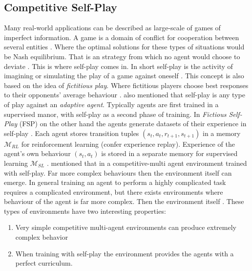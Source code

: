 \documentclass{kththesis}
\theoremstyle{definition}
\begin{document}
\subsection{Competitive Self-Play}
Many real-world applications can be described as large-scale of games of imperfect information. A game is a domain of conflict for cooperation between several entities \parencite{heinrich2016deep}. Where the optimal solutions for these types of situations would be Nash equilibrium. That is an strategy from which no agent would choose to deviate \parencite{heinrich2016deep}. This is where self-play comes in. In short self-play is the activity of imagining or simulating the play of a game against oneself \parencite{heinrich2017reinforcement}. This concept is also based on the idea of \textit{fictitious play}.  Where fictitious players choose best responses to their opponents' average behaviour \parencite{heinrich2016deep}. 
\newline
\newline
\textcite{tampuu2017multiagent} also mentioned that self-play is any type of play against an \textit{adaptive agent}. Typically agents are first trained in a supervised manor, with self-play as a second phase of training. In \textit{Fictious Self-Play} (FSP) on the other hand the agents generate datasets of their experience in self-play \parencite{heinrich2016deep}.  Each agent stores transition tuples $(s_t, a_t, r_{t+1}, s_{t+1})$ in a memory $\mathcal{M}_{RL}$ for reinforcement learning (confer experience replay). Experience of the agent's own behaviour $(s_t, a_t)$ is stored in a separate memory for supervised learning $\mathcal{M}_{SL}$ \parencite{heinrich2016deep}.
\newline
\newline
\textcite{bansal2017emergent} mentioned that in a competitive-multi agent environment trained with self-play. Far more complex behaviours then the environment itself can emerge. In general training an agent to perform a highly complicated task requires a complicated environment, but there exists environments where behaviour of the agent is far more complex. Then the environment itself \parencite{bansal2017emergent}. These types of environments have two interesting properties:

\begin{enumerate}
    \item Very simple competitive multi-agent environments can produce extremely complex behavior
    \item When training with self-play the environment provides the agents with  a perfect curriculum.
\end{enumerate}
\end{document}
